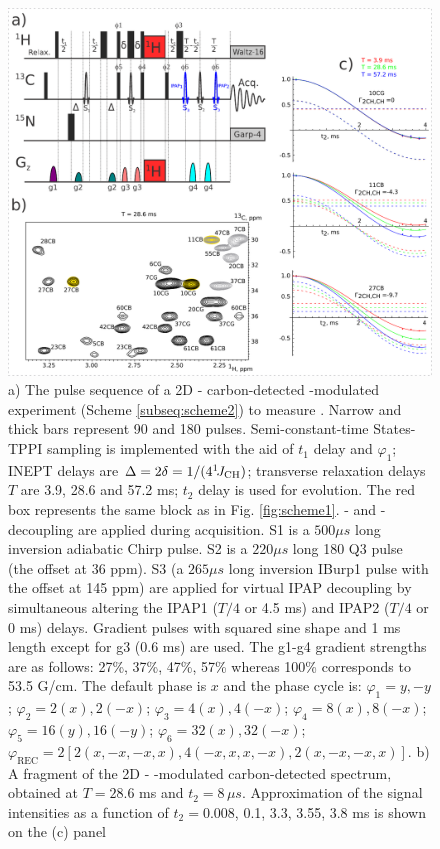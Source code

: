 \documentclass[twocolumn]{svjour3}           %
\begin{document}
\begin{figure}
  \includegraphics[width=1.0\textwidth]{Fig2.pdf}
  \caption{
  a) The pulse sequence of a 2D \hlab-\clab{} carbon-detected 
  \oneJch-modulated experiment (Scheme \ref{subseq:scheme2}) to measure 
  \gtwoCH. 
  Narrow and thick bars represent 90\degree{} and 180\degree{} pulses.
  Semi-constant-time \hlab{} States-{TPPI} sampling is implemented 
  with the aid of $t_1$ delay and $\varphi_1$; 
  {INEPT} delays are $\Delta = 2\delta = 1/(4 ^1\!J_\text{CH})$; 
  transverse relaxation delays $T$ are 3.9, 28.6 and 57.2 ms; 
  $t_2$ delay is used for \oneJch{} evolution. 
  The red box represents the same block as in Fig. \ref{fig:scheme1}. 
  \nlab- and \hlab-decoupling are applied during acquisition. 
  S1 is a $500 \mu s$ long \clab{} inversion adiabatic Chirp pulse. 
  S2 is a $220 \mu s$ long 180\degree{} Q3 pulse (the offset at 36 ppm). 
  S3 (a $265 \mu s$ long inversion IBurp1 pulse with the offset at 145 ppm) 
  are applied for virtual {IPAP} decoupling by simultaneous altering the 
  {IPAP1} ($T/4$ or 4.5 ms) and {IPAP2} ($T/4$ or 0 ms) delays. 
  Gradient pulses with squared sine shape and 1 ms length except for g3 
  (0.6 ms) are used. The g1-g4 gradient strengths are as follows: 
  27\%, 37\%, 47\%, 57\% whereas 100\% corresponds to 53.5 G/cm. 
  The default phase is $x$ and the phase cycle is: 
  $\varphi_1 = y, -y$; 
  $\varphi_2 = 2(x), 2(-x)$; 
  $\varphi_3 = 4(x), 4(-x)$; 
  $\varphi_4 = 8(x), 8(-x)$; 
  $\varphi_5 = 16(y), 16(-y)$; 
  $\varphi_6 = 32(x), 32(-x)$; 
  $\varphi_\text{REC} = 2[2(x, -x, -x, x), 4(-x, x, x, -x), 2(x, -x, -x, x)]$. 
  b) A fragment of the 2D \hlab-\clab{} \oneJch-modulated 
  carbon-detected   spectrum, obtained at $T = 28.6$ ms and 
  $t_2 = 8\,\mu s$. 
  Approximation of the signal intensities as a function of $t_2 = 0.008$, 
  0.1, 3.3, 3.55, 3.8 ms is shown on the (c) panel
  }
  \label{fig:scheme2}
\end{figure}
\end{document}
